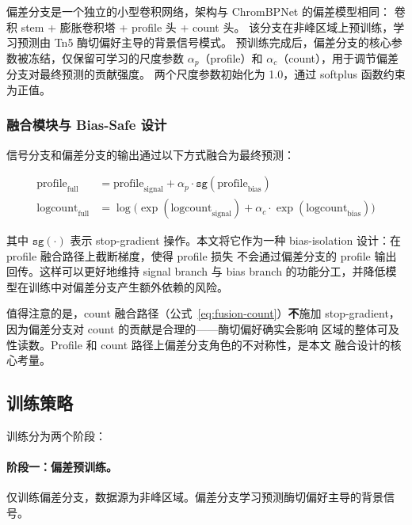 \documentclass[11pt,a4paper]{ctexart}
\begin{document}
偏差分支是一个独立的小型卷积网络，架构与 ChromBPNet 的偏差模型相同：
卷积 stem + 膨胀卷积塔 + profile 头 + count 头。
该分支在非峰区域上预训练，学习预测由 Tn5 酶切偏好主导的背景信号模式。
预训练完成后，偏差分支的核心参数被冻结，仅保留可学习的尺度参数
$\alpha_p$（profile）和 $\alpha_c$（count），用于调节偏差分支对最终预测的贡献强度。
两个尺度参数初始化为 1.0，通过 softplus 函数约束为正值。

\subsubsection{融合模块与 Bias-Safe 设计}

信号分支和偏差分支的输出通过以下方式融合为最终预测：

\begin{align}
  \text{profile}_{\text{full}} &= \text{profile}_{\text{signal}}
    + \alpha_p \cdot \texttt{sg}(\text{profile}_{\text{bias}})
    \label{eq:fusion-profile} \\
  \text{logcount}_{\text{full}} &= \log\bigl(
    \exp(\text{logcount}_{\text{signal}})
    + \alpha_c \cdot \exp(\text{logcount}_{\text{bias}})
  \bigr)
    \label{eq:fusion-count}
\end{align}

其中 $\texttt{sg}(\cdot)$ 表示 stop-gradient 操作。本文将它作为一种
bias-isolation 设计：在 profile 融合路径上截断梯度，使得 profile 损失
不会通过偏差分支的 profile 输出回传。这样可以更好地维持 signal branch 与
bias branch 的功能分工，并降低模型在训练中对偏差分支产生额外依赖的风险。

值得注意的是，count 融合路径（公式~\ref{eq:fusion-count}）\textbf{不}施加
stop-gradient，因为偏差分支对 count 的贡献是合理的——酶切偏好确实会影响
区域的整体可及性读数。Profile 和 count 路径上偏差分支角色的不对称性，是本文
融合设计的核心考量。

\subsection{训练策略}
\label{sec:training}

训练分为两个阶段：

\paragraph{阶段一：偏差预训练。}
仅训练偏差分支，数据源为非峰区域。偏差分支学习预测酶切偏好主导的背景信号。
\end{document}
